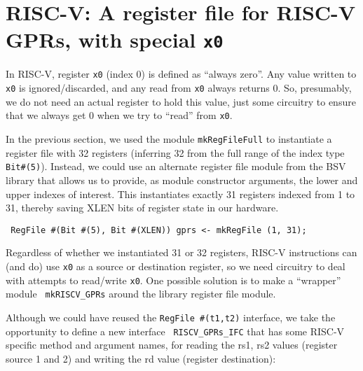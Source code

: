 \Endexercise


\section{RISC-V: A register file for RISC-V GPRs, with special {\tt x0}}

\label{Sec_RISCV_regfile}


In RISC-V, register \verb|x0| (index 0) is defined as ``always zero''.
Any value written to \verb|x0| is ignored/discarded, and any read from
\verb|x0| always returns 0.  So, presumably, we do not need an actual
register to hold this value, just some circuitry to ensure that we
always get 0 when we try to ``read'' from \verb|x0|.

In the previous section, we used the module \verb|mkRegFileFull| to
instantiate a register file with 32 registers (inferring 32 from the
full range of the index type \verb|Bit#(5)|).  Instead, we could use
an alternate register file module from the BSV library that allows us
to provide, as module constructor arguments, the lower and upper
indexes of interest.  This instantiates exactly 31 registers indexed
from 1 to 31, thereby saving XLEN bits of register state in our
hardware.

\begin{tabbing}\small\tt
\hmm RegFile \#(Bit \#(5), Bit \#(XLEN)) gprs <- mkRegFile (1, 31);
\end{tabbing}

Regardless of whether we instantiated 31 or 32 registers, RISC-V
instructions can (and do) use {\tt x0} as a source or destination
register, so we need circuitry to deal with attempts to read/write
{\tt x0}.  One possible solution is to make a ``wrapper'' module {\tt
mkRISCV\_GPRs} around the library register file module.

Although we could have reused the {\tt RegFile \#(t1,t2)} interface,
we take the opportunity to define a new interface {\tt
RISCV\_GPRs\_IFC} that has some RISC-V specific method and argument
names, for reading the rs1, rs2 values (register source 1 and 2) and
writing the rd value (register destination):


